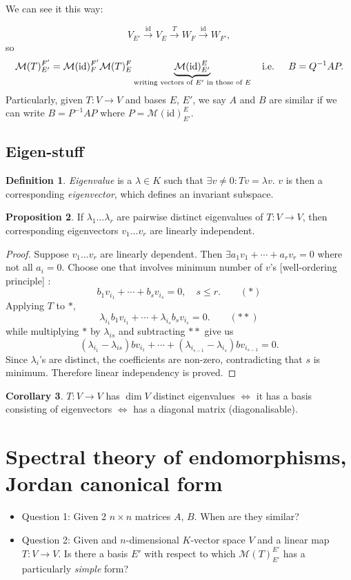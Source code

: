\documentclass[a4paper]{article}
\theoremstyle{definition}
\newtheorem{defn}{Definition}[subsection]
\newtheorem{prop}[defn]{Proposition}
\newtheorem{coro}[defn]{Corollary}
\begin{document}
We can see it this way:

\[
V_{E'} \xrightarrow{\text{id}} V_E \xrightarrow{T} W_F \xrightarrow{\text{id}} W_{F'} ,
\]
so
\[
\mathcal M(T)_{E'}^{F'}=\mathcal M(\text{id})_F^{F'} \mathcal M(T)_E^F \underbrace{\mathcal M (\text{id})_{E'}^E}_{\text{writing vectors of }E' \text{ in those of }E}  \text{\quad i.e. \quad} B = Q^{-1} A P .
\]
Particularly, given $T:V\rightarrow V$ and bases $E$, $E'$, we say $A$ and $B$ are similar if we can write $B = P^{-1} A P$ where $P = \mathcal M (\text{id})_{E'}^E$.

\subsection{Eigen-stuff}

\begin{defn}
	\textit{Eigenvalue} is a $\lambda \in K$ such that $\exists v \neq 0 : Tv=\lambda v$. $v$ is then a corresponding \textit{eigenvector}, which defines an invariant subspace.
\end{defn}

\begin{prop}
	If $\lambda_1 \ldots \lambda_r$ are pairwise distinct eigenvalues of $T:V\rightarrow V$, then corresponding eigenvectors $v_1 \ldots v_r$ are linearly independent.
\end{prop}

\begin{proof}
	Suppose $v_1 \ldots v_r$ are linearly dependent. Then $\exists a_1v_1+\cdots +a_rv_r=0$ where not all $a_i=0$. Choose one that involves minimum number of $v$'s [well-ordering principle] :
\[
b_1v_{i_1}+\cdots+b_sv_{i_s}=0, \quad s \leq r . \qquad (\ast)
\]
Applying $T$ to $\ast$,
\[
\lambda_{i_1} b_1v_{i_1}+\cdots +\lambda_{i_s} b_s v_{i_s} =0 .\qquad (\ast \ast)
\]
while multiplying $\ast$ by $\lambda_{is}$ and subtracting $\ast \ast$ give us
\[
(\lambda_{i_1}-\lambda_{is})bv_{i_1}+\cdots+(\lambda_{i_{s-1}}-\lambda_{i_s}) bv_{i_{s-1}}=0 .
\]
Since $\lambda_i$'s are distinct, the coefficients are non-zero, contradicting that $s$ is minimum. Therefore linear independency is proved.
\end{proof}

\begin{coro}
$T:V\rightarrow V$ has $\dim V$ distinct eigenvalues $\Leftrightarrow$ it has a basis consisting of eigenvectors $\Leftrightarrow$ has a diagonal matrix (diagonalisable).
\end{coro}

\section{Spectral theory of endomorphisms, Jordan canonical form}
\begin{itemize}
	\item Question 1: Given 2 $n\times n$ matrices $A$, $B$. When are they similar?
	\item Question 2: Given and $n$-dimensional $K$-vector space $V$ and a linear map $T:V\rightarrow V$. Is there a basis $E'$ with respect to which $\mathcal M(T)_{E'}^{E'}$ has a particularly \textit{simple} form?
\end{itemize}
\end{document}
